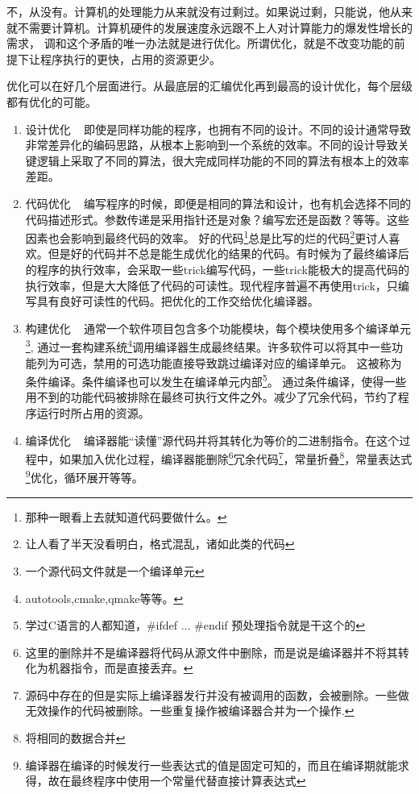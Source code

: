 \documentclass[amstex,twoside]{ctexbook}
\begin{document}
不，从没有。计算机的处理能力从来就没有过剩过。如果说过剩，只能说，他从来就不需要计算机。计算机硬件的发展速度永远跟不上人对计算能力的爆发性增长的需求，
调和这个矛盾的唯一办法就是进行优化。所谓优化，就是不改变功能的前提下让程序执行的更快，占用的资源更少。

优化可以在好几个层面进行。从最底层的汇编优化再到最高的设计优化，每个层级都有优化的可能。

\begin{enumerate}
\item 设计优化	~	即使是同样功能的程序，也拥有不同的设计。不同的设计通常导致非常差异化的编码思路，从根本上影响到一个系统的效率。不同的设计导致关键逻辑上采取了不同的算法，很大完成同样功能的不同的算法有根本上的效率差距。

\item 代码优化	~	编写程序的时候，即便是相同的算法和设计，也有机会选择不同的代码描述形式。参数传递是采用指针还是对象？编写宏还是函数？等等。这些因素也会影响到最终代码的效率。
好的代码\footnote{那种一眼看上去就知道代码要做什么。}总是比写的烂的代码\footnote{让人看了半天没看明白，格式混乱，诸如此类的代码}更讨人喜欢。但是好的代码并不总是能生成优化的结果的代码。有时候为了最终编译后的程序的执行效率，会采取一些trick编写代码，一些trick能极大的提高代码的执行效率，但是大大降低了代码的可读性。现代程序普遍不再使用trick，只编写具有良好可读性的代码。把优化的工作交给优化编译器。

\item 构建优化	~	通常一个软件项目包含多个功能模块，每个模块使用多个编译单元\footnote{一个源代码文件就是一个编译单元}, 通过一套构建系统\footnote{autotools,cmake,qmake等等。}调用编译器生成最终结果。许多软件可以将其中一些功能列为可选，禁用的可选功能直接导致跳过编译对应的编译单元。
这被称为条件编译。条件编译也可以发生在编译单元内部\footnote{学过C语言的人都知道，\#ifdef ... \#endif 预处理指令就是干这个的}。
通过条件编译，使得一些用不到的功能代码被排除在最终可执行文件之外。减少了冗余代码，节约了程序运行时所占用的资源。

\item 编译优化	~	编译器能“读懂”源代码并将其转化为等价的二进制指令。在这个过程中，如果加入优化过程，编译器能删除\footnote{这里的删除并不是编译器将代码从源文件中删除，而是说是编译器并不将其转化为机器指令，而是直接丢弃。}冗余代码\footnote{源码中存在的但是实际上编译器发行并没有被调用的函数，会被删除。一些做无效操作的代码被删除。一些重复操作被编译器合并为一个操作.}，常量折叠\footnote{将相同的数据合并}，常量表达式\footnote{编译器在编译的时候发行一些表达式的值是固定可知的，而且在编译期就能求得，故在最终程序中使用一个常量代替直接计算表达式}优化，循环展开等等。


\end{enumerate}
\end{document}
